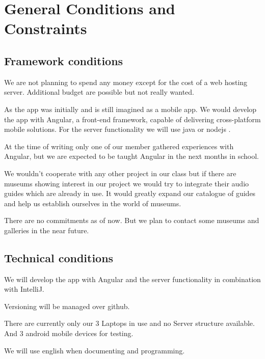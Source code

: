 \documentclass[12pt]{article}
\theoremstyle{definition}
\newenvironment{text}{
}{}
\begin{document}
\pagebreak
 
\section{General Conditions and Constraints}

\subsection{Framework conditions} 
\begin{text}

We are not planning to spend any money except for the cost of a web hosting server. Additional budget are possible but not really wanted.\newline

As the app was initially and is still imagined as a mobile app. We would develop the app with Angular, a front-end framework, capable of delivering cross-platform mobile solutions. For the server functionality we will use java or nodejs .\newline
 
At the time of writing only one of our member gathered experiences with Angular, but we are expected to be taught Angular in the next months in school.\newline
 
We wouldn't cooperate with any other project in our class but if there are museums showing interest in our project we would try to integrate their audio guides
which are already in use. It would greatly expand our catalogue of guides and help us establish ourselves in the world of museums.\newline
 
There are no commitments as of now. But we plan to contact some museums and galleries in the near future.

\end{text}

\subsection{Technical conditions}
\begin{text}

We will develop the app with Angular and the server functionality in combination with IntelliJ.

Versioning will be managed over github.\newline
 
There are currently only our 3 Laptops in use and no Server structure available. And 3 android mobile devices for testing.\newline
 
We will use english when documenting and programming.

\end{text}
  
\end{document}
